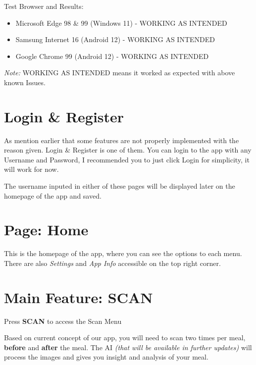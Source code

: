 \documentclass[a4paper,12pt]{article}
\begin{document}
\noindent
Test Browser and Results:
\begin{itemize}
    \item Microsoft Edge 98 \& 99 (Windows 11) - WORKING AS INTENDED
    \item Samsung Internet 16 (Android 12) - WORKING AS INTENDED
    \item Google Chrome 99  (Android 12) - WORKING AS INTENDED
\end{itemize}

\noindent
\textit{Note:} WORKING AS INTENDED means it worked as expected with above known Issues.

\pagebreak
\section{Login \& Register}


As mention earlier that some features are not properly implemented with the reason given.
Login \& Register is one of them. You can login to the app with any Username and
Password, I recommended you to just click Login for simplicity, it will work for now.

The username inputed in either of these pages will be displayed later on
the homepage of the app and saved.

\pagebreak
\section{Page: Home}


This is the homepage of the app, where you can see the options to each menu.
There are also \textit{Settings} and \textit{App Info} accessible on the top right corner.

\pagebreak
\section{Main Feature: SCAN}

Press \textbf{SCAN} to access the Scan Menu


Based on current concept of our app, you will need to scan two times per meal,
\textbf{before} and \textbf{after} the meal.
The AI \textit{(that will be available in further updates)} will process
the images and gives you insight and analysis of your meal.
\end{document}
